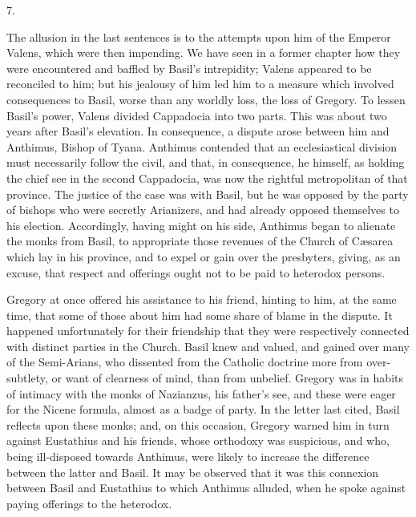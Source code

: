 7.

The allusion in the last sentences is to the attempts upon him of
the Emperor Valens, which were then impending. We have seen in a
former chapter how they were encountered and baffled by Basil's
intrepidity; Valens appeared to be reconciled to him; but his jealousy
of him led him to a measure which involved consequences to Basil,
worse than any worldly loss, the loss of Gregory. To lessen Basil's
power, Valens divided Cappadocia into two parts. This was about two
years after Basil's elevation. In consequence, a dispute arose between
him and Anthimus, Bishop of Tyana. Anthimus contended that an
ecclesiastical division must necessarily follow the civil, and that,
in consequence, he himself, as holding the chief see in the second
Cappadocia, was now the rightful metropolitan of that province. The
justice of the case was with Basil, but he was opposed by the party of
bishops who were secretly Arianizers, and had already opposed
themselves to his election. Accordingly, having might on his side,
Anthimus began to alienate the monks from Basil, to appropriate those
revenues of the Church of Cæsarea which lay in his province, and to
expel or gain over the presbyters, giving, as an excuse, that respect
and offerings ought not to be paid to heterodox persons.

Gregory at once offered his assistance to his friend, hinting to
him, at the same time, that some of those about him had some share of
blame in the dispute. It happened unfortunately for their friendship
that they were respectively connected with distinct parties in the
Church. Basil knew and valued, and gained over many of the
Semi-Arians, who dissented from the Catholic doctrine more from
over-subtlety, or want of clearness of mind, than from unbelief.
Gregory was in habits of intimacy with the monks of Nazianzus, his
father's see, and these were eager for the Nicene formula, almost as a
badge of party. In the letter last cited, Basil reflects upon these
monks; and, on this occasion, Gregory warned him in turn against
Eustathius and his friends, whose orthodoxy was suspicious, and who,
being ill-disposed towards Anthimus, were likely to increase the
difference between the latter and Basil. It may be observed that it
was this connexion between Basil and Eustathius to which Anthimus
alluded, when he spoke against paying offerings to the heterodox.

